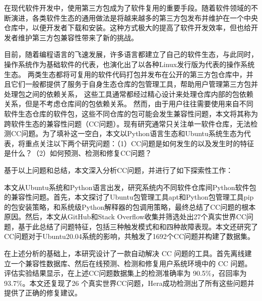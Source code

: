 \begin{cabstract}
在现代软件开发中，使用第三方包成为了软件复用的重要手段。随着软件领域的不断演进，各类软件生态的通用做法是将越来越多的第三方包发布并维护在一个中央仓库中，以便开发者下载和安装。这种方式极大的提高了软件开发效率，但也给开发者维护第三方包兼容性带来了新的挑战。

目前，随着编程语言的飞速发展，许多语言都建立了自己的软件生态，与此同时，操作系统作为基础软件的代表，也演化出了以各种Linux发行版为代表的操作系统生态。
两类生态都将可复用的软件代码打包并发布在公开的第三方包仓库中，并且它们一般都提供了服务于自身生态仓库的包管理工具，帮助用户管理第三方包并处理包之间的依赖关系，
这些工具通常都经过精心设计来处理仓库内部的包依赖关系，但是不考虑仓库间的包依赖关系。
然而，由于用户往往需要使用来自不同软件生态仓库的软件包，这些不同仓库的包可能会发生兼容性问题，本文将其称为跨软件生态的兼容性问题（CC问题）。现有研究通常只关注单一软件仓库，无法检测CC问题。为了填补这一空白，本文以Python语言生态和Ubuntu系统生态为代表，将重点关注以下两个研究问题：（1）CC问题是如何发生的以及发生时的特征是什么？（2）如何预测、检测和修复CC问题？

基于以上问题和总结，本文深入分析CC问题，并进行了如下探索性工作：
\begin{compactitem}
	\item 本文从Ubuntu系统和Python语言出发，研究系统内不同软件仓库间Python软件包的兼容性问题。首先，本文探讨了Ubuntu包管理工具apt和Python包管理工具pip的包安装策略，和系统级Python解释器的包调用策略，最终总结了CC问题的根本原因。然后，本文从GitHub和Stack Overflow收集并筛选处出27个真实世界CC问题，基于此总结了问题特征，包括三种触发模式和和四种故障表现。本文还研究了CC问题对于Ubuntu20.04系统的影响，共触发了1692个CC问题并构建了数据集。
	\item 在上述分析的基础上，本研究设计了一款自动解决 CC 问题的工具\tool{}。\tool{}首先离线建立一个兼容性数据库、然后在线预测、检测和修复用户系统环境中的 CC 问题。评估实验结果显示，\tool{}在上述CC问题数据集上的检测准确率为 90.5\%，召回率为 93.7\%。本文还复现了26 个真实世界CC问题，Hera成功检测出了所有这些问题并提供了正确的修复建议。
\end{compactitem}
\end{cabstract}

\newpage
\mbox{}
\newpage


